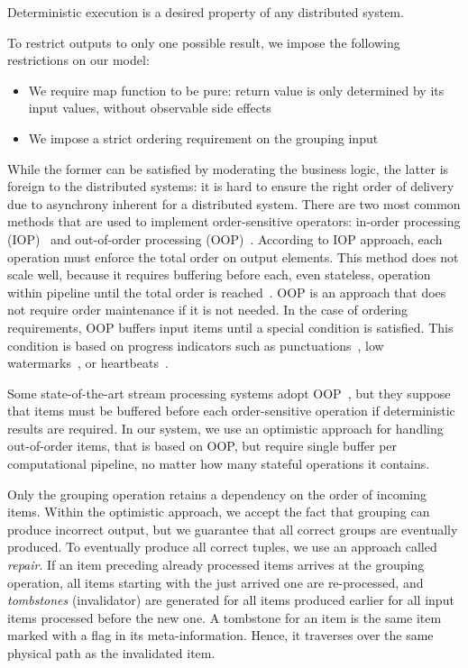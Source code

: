 \label {fs-collision}

Deterministic execution is a desired property of any distributed system. 

To restrict outputs to only one possible result, we impose the following  restrictions on our model: 

\begin{itemize}
  \item We require map function to be pure: return value is only determined by its input values, without observable side effects
  \item We impose a strict ordering requirement on the grouping  input
\end{itemize}

While the former can be satisfied by moderating the  business logic, the latter is foreign to the distributed systems: it is hard to ensure the right order of delivery due to asynchrony inherent for a distributed system. There are two most common methods that are used to implement order-sensitive operators: in-order processing (IOP)~\cite{Arasu:2006:CCQ:1146461.1146463, Cranor:2003:GSD:872757.872838} and out-of-order processing (OOP)~\cite{Li:2008:OPN:1453856.1453890}. According to IOP approach, each operation must enforce the total order on output elements. This method does not scale well, because it requires buffering before each, even stateless, operation within pipeline until the total order is reached~\cite{Li:2008:OPN:1453856.1453890}. OOP is an approach that does not require order maintenance if it is not needed. In the case of ordering requirements, OOP buffers input items until a special condition is satisfied. This condition is based on progress indicators such as punctuations~\cite{Tucker:2003:EPS:776752.776780}, low watermarks~\cite{Akidau:2013:MFS:2536222.2536229}, or heartbeats~\cite{Srivastava:2004:FTM:1055558.1055596}.  

Some state-of-the-art stream processing systems adopt OOP~\cite{Carbone:2017:SMA:3137765.3137777}, but they suppose that items must be buffered before each order-sensitive operation if deterministic results are required. In our system, we use an optimistic approach for handling out-of-order items, that is based on OOP, but require single buffer per computational pipeline, no matter how many stateful operations it contains.

Only the grouping operation retains a dependency on the order of incoming items. Within the  optimistic approach, we accept the fact that grouping can produce incorrect output, but we guarantee that all correct groups are eventually produced. To eventually produce all correct tuples, we use an approach called {\it repair}. If an item preceding already processed items arrives at the grouping operation, all items starting with the just arrived one are re-processed, and {\em tombstones} (invalidator) are generated for all items produced earlier for all input items processed before the new one. A tombstone for an item is the same item marked with a flag in its meta-information. Hence, it traverses over the same physical path as the invalidated item.

